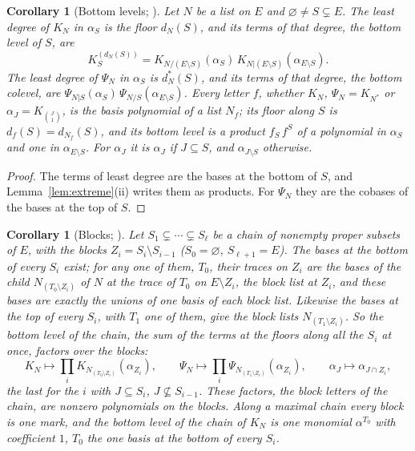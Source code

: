 \documentclass[11pt]{article}
\theoremstyle{plain}
\newtheorem{cor}[prop]{Corollary}
\theoremstyle{definition}
\theoremstyle{remark}
\begin{document}
\begin{cor}[Bottom levels; {\cite[Thm.~12.17, p.~73]{F}}]\label{lem:initial}
Let $N$ be a list on $E$ and $\varnothing\neq S\subsetneq E$. The least degree of $K_N$ in $\alpha_S$ is the floor $d_N(S)$, and its terms of that degree, the \emph{bottom level} of $S$, are
\[
K^{(d_N(S))}_S=K_{N/(E\setminus S)}(\alpha_S)\,K_{N|(E\setminus S)}(\alpha_{E\setminus S}).
\]
The least degree of $\Psi_N$ in $\alpha_S$ is $d^\ast_N(S)$, and its terms of that degree, the \emph{bottom colevel}, are $\Psi_{N|S}(\alpha_S)\,\Psi_{N/S}(\alpha_{E\setminus S})$. Every letter $f$, whether $K_N$, $\Psi_N=K_{N^\ast}$ or $\alpha_J=K_{\binom J1}$, is the basis polynomial of a list $N_f$; its \emph{floor} along $S$ is $d_f(S)=d_{N_f}(S)$, and its bottom level is a product $f_S\,f^S$ of a polynomial in $\alpha_S$ and one in $\alpha_{E\setminus S}$. For $\alpha_J$ it is $\alpha_J$ if $J\subseteq S$, and $\alpha_{J\setminus S}$ otherwise.
\end{cor}

\begin{proof}
The terms of least degree are the bases at the bottom of $S$, and Lemma~\ref{lem:extreme}(ii) writes them as products. For $\Psi_N$ they are the cobases of the bases at the top of $S$.
\end{proof}

\begin{cor}[Blocks; {\cite[Lemma~8.5, Thm.~8.7(ii), p.~55; Thm.~12.17, p.~73; Prop.~14.5, p.~82]{F}}]\label{cor:blocks}
Let $S_1\subsetneq\cdots\subsetneq S_\ell$ be a chain of nonempty proper subsets of $E$, with the \emph{blocks} $Z_i=S_i\setminus S_{i-1}$ ($S_0=\varnothing$, $S_{\ell+1}=E$). The bases at the bottom of every $S_i$ exist; for any one of them, $T_0$, their traces on $Z_i$ are the bases of the child $N_{(T_0\setminus Z_i)}$ of $N$ at the trace of $T_0$ on $E\setminus Z_i$, the \emph{block list} at $Z_i$, and these bases are exactly the unions of one basis of each block list. Likewise the bases at the top of every $S_i$, with $T_1$ one of them, give the block lists $N_{(T_1\setminus Z_i)}$. So the \emph{bottom level of the chain}, the sum of the terms at the floors along all the $S_i$ at once, factors over the blocks:
\[
K_N\mapsto\prod_iK_{N_{(T_0\setminus Z_i)}}(\alpha_{Z_i}),\qquad \Psi_N\mapsto\prod_i\Psi_{N_{(T_1\setminus Z_i)}}(\alpha_{Z_i}),\qquad \alpha_J\mapsto\alpha_{J\cap Z_i},
\]
the last for the $i$ with $J\subseteq S_i$, $J\not\subseteq S_{i-1}$. These factors, the \emph{block letters} of the chain, are nonzero polynomials on the blocks. Along a maximal chain every block is one mark, and the bottom level of the chain of $K_N$ is one monomial $\alpha^{T_0}$ with coefficient $1$, $T_0$ the one basis at the bottom of every $S_i$.
\end{cor}
\end{document}
